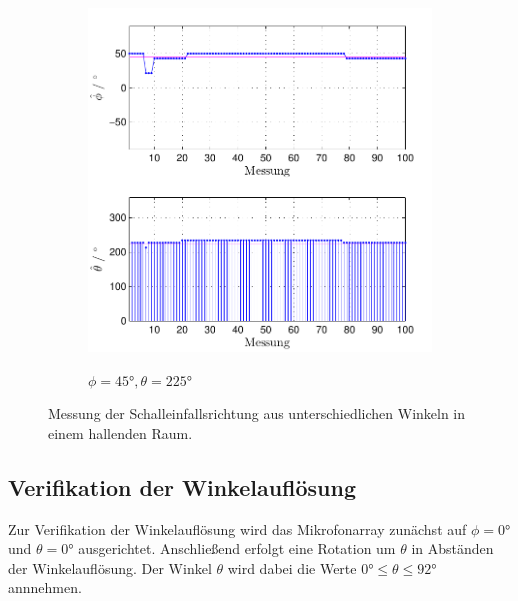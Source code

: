 \begin{figure}
\begin{subfigure}[b]{0.48\textwidth}
                \includegraphics[width=\textwidth]{images/04_Echtzeitversuch/MALE_Phi_45_Theta_225}
                \label{fig:Foto_DSP_Draufsicht}
                \caption{$\phi=45°, \theta = 225°$}
        \end{subfigure}
        \caption{Messung der Schalleinfallsrichtung aus unterschiedlichen Winkeln in einem hallenden Raum.}
        \label{fig:test_echtzeit_grundfunktion}
\end{figure}



\subsection{Verifikation der Winkelauflösung}
\label{subsec:VerifikationWinkelaufloesung}
Zur Verifikation der Winkelauflösung wird das Mikrofonarray zunächst auf $\phi=0°$ und $\theta=0°$ ausgerichtet. Anschließend erfolgt eine Rotation um $\theta$ in Abständen der Winkelauflösung. Der Winkel $\theta$ wird dabei die Werte $0° \leq \theta \leq 92°$ annnehmen.
 
